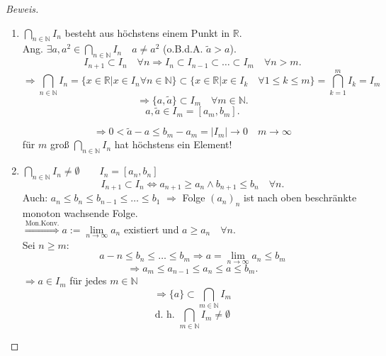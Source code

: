 \documentclass[12pt,a4paper,titlepage]{article} %
\theoremstyle{definition}
\theoremstyle{remark}
\newenvironment{bew}{\begin{proof}[Beweis]}{\end{proof}}
\newcommand{\N}{\mathbb{N}}
\newcommand{\R}{\mathbb{R}}
\newcommand{\limes}[1]{\lim\limits_{#1\rightarrow\infty}}
\begin{document}
\begin{bew}
	\begin{enumerate}
		\item \( \bigcap_{n\in\N} I_n \) besteht aus höchstens einem Punkt in \(\R\).\\
		Ang. \( \exists a, a^2 \in \bigcap_{n\in\N} I_n \quad a\neq a^2 \) (o.B.d.A. \(\tilde{a}>a\)).\\
		\[I_{n+1} \subset I_n \quad\forall n \Rightarrow I_n \subset I_{n-1} \subset \ldots\subset I_m \quad \forall n>m.\]
		\[ \Rightarrow \bigcap_{n\in\N} I_n = \{ x\in\R| x\in I_n \forall n\in\N \} \subset \{ x\in\R|x\in I_k \quad \forall 1\leq k \leq m \} = \bigcap_{k=1}^m I_k = I_m \]
		\[ \Rightarrow \{ a,\tilde{a} \} \subset I_m \quad\forall m\in\N. \]
		\[a,\tilde{a} \in I_m = [a_m,b_m]. \]
		\begin{center}
		\end{center}
		\[\Rightarrow 0<\tilde{a}-a \leq b_m - a_m = |I_m| \rightarrow 0 \quad m\rightarrow\infty \]
		\Lightning für \(m\) groß \(\bigcap_{n\in\N} I_n\) hat höchstens ein Element!
		\item \( \bigcap_{n\in\N} I_n \neq \emptyset \qquad I_n = [a_n,b_n] \)\\
		\[I_{n+1} \subset I_n \Leftrightarrow a_{n+1} \geq a_n \wedge b_{n+1} \leq b_n \quad \forall n. \]
		Auch: \( a_n \leq b_n \leq b_{n-1} \leq \ldots\leq b_1 \)
		\( \Rightarrow \) Folge \((a_n)_n\) ist nach oben beschränkte monoton wachsende Folge.\\
		\( \overset{\text{Mon.Konv.}}{\Rightarrow} a:= \limes{n} a_n \) existiert und \(a\geq a_n \quad \forall n \).\\
		Sei \(n\geq m:\)
		\[a-n\leq b_n\leq\ldots\leq b_m \Rightarrow a = \limes{n} a_n \leq b_m \]\[\Rightarrow a_m\leq a_{n-1}\leq a_n\leq a\leq b_m. \]
		\( \Rightarrow a\in I_m\) für jedes \(m\in\N\)\\
		\[  \Rightarrow \{a\}\subset \bigcap_{m\in\N} I_m \]
		\[ \text{d. h. } \bigcap_{m\in\N} I_m \neq \emptyset \]
	\end{enumerate}
\end{bew}
\end{document}

